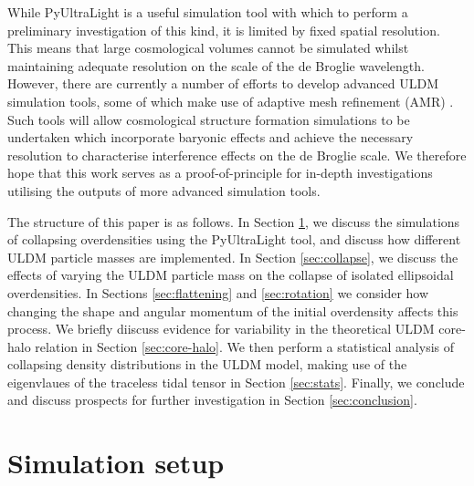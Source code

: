 \documentclass[a4paper,11pt]{article}
\begin{document}
While {\sc PyUltraLight} is a useful simulation tool with which to perform a preliminary investigation of this kind, it is limited by fixed spatial resolution. This means that large cosmological volumes cannot be simulated whilst maintaining adequate resolution on the scale of the de Broglie wavelength. However, there are currently a number of efforts to develop advanced ULDM simulation tools, some of which make use of adaptive mesh refinement (AMR) \cite{Mocz:2019emo, Niemeyer:2019aqm, Veltmaat:2019hou}. Such tools will allow cosmological structure formation simulations to be undertaken which incorporate baryonic effects and achieve the necessary resolution to characterise interference effects on the de Broglie scale. We therefore hope that this work serves as a proof-of-principle for in-depth investigations utilising the outputs of more advanced simulation tools. 

The structure of this paper is as follows. In Section \ref{sec:sims}, we discuss the simulations of collapsing overdensities using the {\sc PyUltraLight} tool, and discuss how different ULDM particle masses are implemented. In Section \ref{sec:collapse}, we discuss the effects of varying the ULDM particle mass on the collapse of isolated ellipsoidal overdensities. In Sections \ref{sec:flattening} and \ref{sec:rotation} we consider how changing the shape and angular momentum of the initial overdensity affects this process. We briefly diiscuss evidence for variability in the theoretical ULDM core-halo relation in Section \ref{sec:core-halo}. We then perform a statistical analysis of collapsing density distributions in the ULDM model, making use of the eigenvlaues of the traceless tidal tensor in Section \ref{sec:stats}. Finally, we conclude and discuss prospects for further investigation in Section \ref{sec:conclusion}.


\section{Simulation setup}\label{sec:sims}
\end{document}
